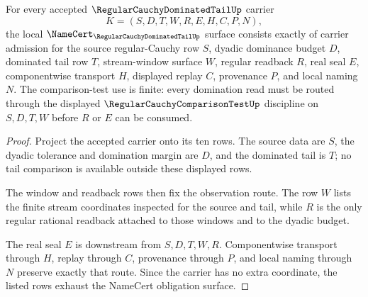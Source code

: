 \begin{theorem}
\label{thm:regular-cauchy-dominated-tail-obligation-surface}
For every accepted $\RegularCauchyDominatedTailUp$ carrier
$$
K=(S,D,T,W,R,E,H,C,P,N),
$$
the local $\NameCert_{\RegularCauchyDominatedTailUp}$ surface consists exactly of carrier admission for the source regular-Cauchy row $S$, dyadic dominance budget $D$, dominated tail row $T$, stream-window surface $W$, regular readback $R$, real seal $E$, componentwise transport $H$, displayed replay $C$, provenance $P$, and local naming $N$. The comparison-test use is finite: every domination read must be routed through the displayed $\RegularCauchyComparisonTestUp$ discipline on $S,D,T,W$ before $R$ or $E$ can be consumed.
\end{theorem}
\begin{proof}
Project the accepted carrier onto its ten rows. The source data are $S$, the dyadic tolerance and domination margin are $D$, and the dominated tail is $T$; no tail comparison is available outside these displayed rows.

The window and readback rows then fix the observation route. The row $W$ lists the finite stream coordinates inspected for the source and tail, while $R$ is the only regular rational readback attached to those windows and to the dyadic budget.

The real seal $E$ is downstream from $S,D,T,W,R$. Componentwise transport through $H$, replay through $C$, provenance through $P$, and local naming through $N$ preserve exactly that route. Since the carrier has no extra coordinate, the listed rows exhaust the NameCert obligation surface.
\end{proof}


